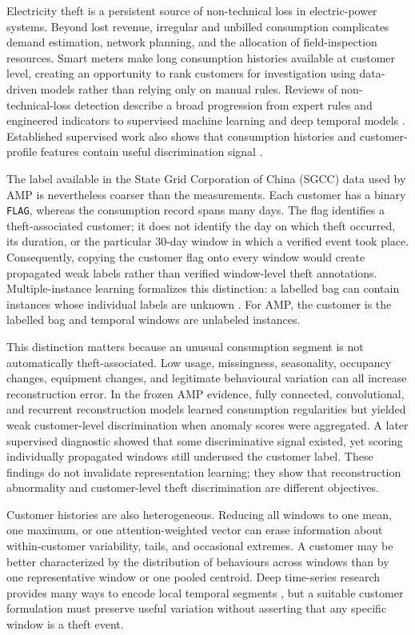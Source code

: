Electricity theft is a persistent source of non-technical loss in electric-power systems. Beyond lost revenue, irregular and unbilled consumption complicates demand estimation, network planning, and the allocation of field-inspection resources. Smart meters make long consumption histories available at customer level, creating an opportunity to rank customers for investigation using data-driven models rather than relying only on manual rules. Reviews of non-technical-loss detection describe a broad progression from expert rules and engineered indicators to supervised machine learning and deep temporal models \cite{Messinis2018NTLReview}. Established supervised work also shows that consumption histories and customer-profile features contain useful discrimination signal \cite{Buzau2019NTL,Zheng2018WideDeep,Hasan2019CNNLSTM}.

The label available in the State Grid Corporation of China (SGCC) data used by AMP is nevertheless coarser than the measurements. Each customer has a binary \texttt{FLAG}, whereas the consumption record spans many days. The flag identifies a theft-associated customer; it does not identify the day on which theft occurred, its duration, or the particular 30-day window in which a verified event took place. Consequently, copying the customer flag onto every window would create propagated weak labels rather than verified window-level theft annotations. Multiple-instance learning formalizes this distinction: a labelled bag can contain instances whose individual labels are unknown \cite{Carbonneau2018MILSurvey}. For AMP, the customer is the labelled bag and temporal windows are unlabeled instances.

This distinction matters because an unusual consumption segment is not automatically theft-associated. Low usage, missingness, seasonality, occupancy changes, equipment changes, and legitimate behavioural variation can all increase reconstruction error. In the frozen AMP evidence, fully connected, convolutional, and recurrent reconstruction models learned consumption regularities but yielded weak customer-level discrimination when anomaly scores were aggregated. A later supervised diagnostic showed that some discriminative signal existed, yet scoring individually propagated windows still underused the customer label. These findings do not invalidate representation learning; they show that reconstruction abnormality and customer-level theft discrimination are different objectives.

Customer histories are also heterogeneous. Reducing all windows to one mean, one maximum, or one attention-weighted vector can erase information about within-customer variability, tails, and occasional extremes. A customer may be better characterized by the distribution of behaviours across windows than by one representative window or one pooled centroid. Deep time-series research provides many ways to encode local temporal segments \cite{Fawaz2019TimeSeriesReview}, but a suitable customer formulation must preserve useful variation without asserting that any specific window is a theft event.

